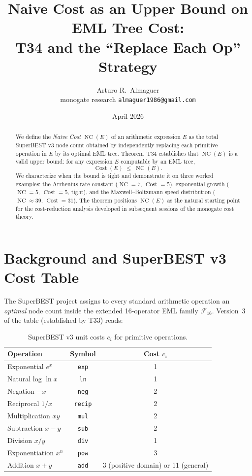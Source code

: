 \documentclass[12pt,a4paper]{article}
\title{Naive Cost as an Upper Bound on EML Tree Cost:\\
       T34 and the ``Replace Each Op'' Strategy}
\author{Arturo R.\ Almaguer\\
\small monogate research \quad \texttt{almaguer1986@gmail.com}}
\date{April 2026}
\theoremstyle{definition}
\newcommand{\NC}{\operatorname{NC}}
\newcommand{\Cost}{\operatorname{Cost}}
\begin{document}
\maketitle

\begin{abstract}
We define the \emph{Naive Cost} $\NC(E)$ of an arithmetic expression $E$ as
the total SuperBEST v3 node count obtained by independently replacing each
primitive operation in $E$ by its optimal EML tree.
Theorem~T34 establishes that $\NC(E)$ is a valid upper bound: for any
expression $E$ computable by an EML tree,
\[
  \Cost(E) \;\leq\; \NC(E).
\]
We characterize when the bound is tight and demonstrate it on three worked
examples: the Arrhenius rate constant ($\NC=7$, $\Cost=5$), exponential
growth ($\NC=5$, $\Cost=5$, tight), and the Maxwell--Boltzmann speed
distribution ($\NC\approx 39$, $\Cost=31$).
The theorem positions $\NC(E)$ as the natural starting point for the
cost-reduction analysis developed in subsequent sessions of the
monogate cost theory.
\end{abstract}

\tableofcontents
\bigskip

\section{Background and SuperBEST v3 Cost Table}
\label{sec:background}

The SuperBEST project assigns to every standard arithmetic operation
an \emph{optimal} node count inside the extended 16-operator EML family
$\mathcal{F}_{16}$.
Version~3 of the table (established by T33) reads:

\begin{table}[h]
\centering
\caption{SuperBEST v3 unit costs $c_i$ for primitive operations.}
\label{tab:superbest3}
\smallskip
\begin{tabular}{@{}lcc@{}}
\toprule
\textbf{Operation} & \textbf{Symbol} & \textbf{Cost $c_i$} \\
\midrule
Exponential  $e^x$   & \texttt{exp} & 1 \\
Natural log  $\ln x$ & \texttt{ln}  & 1 \\
Negation     $-x$    & \texttt{neg} & 2 \\
Reciprocal   $1/x$   & \texttt{recip} & 2 \\
Multiplication $xy$  & \texttt{mul} & 2 \\
Subtraction  $x-y$   & \texttt{sub} & 2 \\
Division     $x/y$   & \texttt{div} & 1 \\
Exponentiation $x^n$ & \texttt{pow} & 3 \\
Addition     $x+y$   & \texttt{add} & 3 (positive domain) or 11 (general) \\
\bottomrule
\end{tabular}
\end{table}
\end{document}
